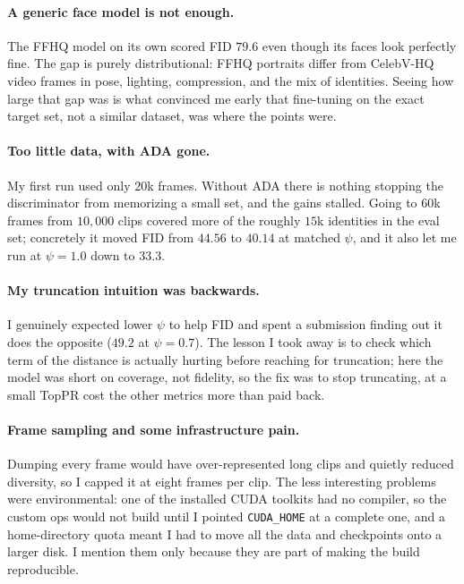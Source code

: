 \documentclass{article}
\begin{document}
\paragraph{A generic face model is not enough.}
The FFHQ model on its own scored FID $79.6$ even though its faces look perfectly fine. The gap is purely
distributional: FFHQ portraits differ from CelebV-HQ video frames in pose, lighting, compression, and the
mix of identities. Seeing how large that gap was is what convinced me early that fine-tuning on the exact
target set, not a similar dataset, was where the points were.

\paragraph{Too little data, with ADA gone.}
My first run used only $20$k frames. Without ADA there is nothing stopping the discriminator from
memorizing a small set, and the gains stalled. Going to $60$k frames from $10{,}000$ clips covered more of
the roughly $15$k identities in the eval set; concretely it moved FID from $44.56$ to $40.14$ at matched
$\psi$, and it also let me run at $\psi=1.0$ down to $33.3$.

\paragraph{My truncation intuition was backwards.}
I genuinely expected lower $\psi$ to help FID and spent a submission finding out it does the opposite
($49.2$ at $\psi=0.7$). The lesson I took away is to check which term of the distance is actually hurting
before reaching for truncation; here the model was short on coverage, not fidelity, so the fix was to stop
truncating, at a small TopPR cost the other metrics more than paid back.

\paragraph{Frame sampling and some infrastructure pain.}
Dumping every frame would have over-represented long clips and quietly reduced diversity, so I capped it at
eight frames per clip. The less interesting problems were environmental: one of the installed CUDA
toolkits had no compiler, so the custom ops would not build until I pointed \texttt{CUDA\_HOME} at a
complete one, and a home-directory quota meant I had to move all the data and checkpoints onto a larger
disk. I mention them only because they are part of making the build reproducible.
\end{document}
